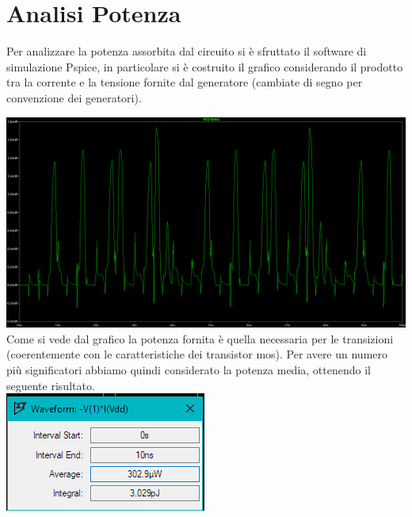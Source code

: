 \documentclass[12pt]{article} %
\begin{document}
\clearpage
\section{Analisi Potenza}

Per analizzare la potenza assorbita dal circuito si è sfruttato il software di simulazione Pspice, in particolare si è costruito il grafico considerando il prodotto tra la corrente e la tensione fornite dal generatore (cambiate di segno per convenzione dei generatori).

\includegraphics[scale = 0.35]{power}\\

Come si vede dal grafico la potenza fornita è quella necessaria per le transizioni (coerentemente con le caratteristiche dei transistor mos). Per avere un numero più significatori abbiamo quindi considerato la potenza media, ottenendo il seguente risultato.\\

\includegraphics[scale = 1]{powerAvg}
\end{document}
